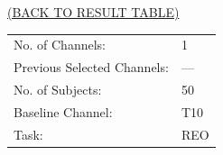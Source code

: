 \documentclass[oneside, a4paper,10pt]{report}
\begin{document}
\newpage

\hspace*{12cm}\hyperlink{tab:TestResults}{(BACK TO RESULT TABLE)}

\bigskip
\bigskip

\begin{tabular}{ll}
  No. of Channels: & 1\\
  Previous Selected Channels: & ---\\
  No. of Subjects: & 50\\
  Baseline Channel: & T10\\
  Task:	& REO 
\end{tabular}

\bigskip
\end{document}
